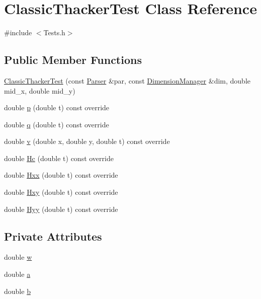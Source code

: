 \hypertarget{classClassicThackerTest}{}\section{Classic\+Thacker\+Test Class Reference}
\label{classClassicThackerTest}


{\ttfamily \#include $<$Tests.\+h$>$}

\subsection*{Public Member Functions}
\begin{DoxyCompactItemize}
\item 
\hyperlink{classClassicThackerTest_aa7464ce482c49b8fe581c0b2b8c277af}{Classic\+Thacker\+Test} (const \hyperlink{structParser}{Parser} \&par, const \hyperlink{structDimensionManager}{Dimension\+Manager} \&dim, double mid\+\_\+x, double mid\+\_\+y)
\item 
double \hyperlink{classClassicThackerTest_a485cf3ccda6e8573c83b5e9dca726c13}{p} (double t) const override
\item 
double \hyperlink{classClassicThackerTest_a732011d2dec24e6c747282391a72ccbf}{q} (double t) const override
\item 
double \hyperlink{classClassicThackerTest_a7dcad970cbd5afaec513109e701075e8}{v} (double x, double y, double t) const override
\item 
double \hyperlink{classClassicThackerTest_a92f8906e919b046b788aeb88b446884b}{Hc} (double t) const override
\item 
double \hyperlink{classClassicThackerTest_a5c802e8ef039c0620dc2908987c9097e}{Hxx} (double t) const override
\item 
double \hyperlink{classClassicThackerTest_adc43007df549bdb1d2ac940199740157}{Hxy} (double t) const override
\item 
double \hyperlink{classClassicThackerTest_a6c632dcd0ae4f38dd2e9e69282281df5}{Hyy} (double t) const override
\end{DoxyCompactItemize}
\subsection*{Private Attributes}
\begin{DoxyCompactItemize}
\item 
double \hyperlink{classClassicThackerTest_a7d8bb5cdf1e9d59153a6d3afba6c308a}{w}
\item 
double \hyperlink{classClassicThackerTest_a25f90e2b8096f534f71036cc58c2ba95}{a}
\item 
double \hyperlink{classClassicThackerTest_a47d1748d983fa34782d765fdfc9eea32}{b}
\end{DoxyCompactItemize}
